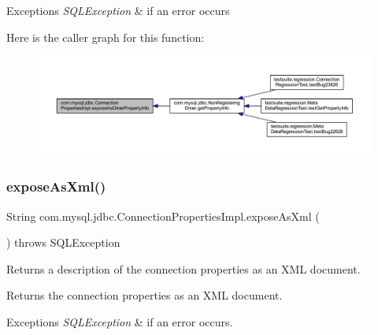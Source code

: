 \begin{DoxyExceptions}{Exceptions}
{\em S\+Q\+L\+Exception} & if an error occurs \\
\hline
\end{DoxyExceptions}
Here is the caller graph for this function\+:\nopagebreak
\begin{figure}[H]
\begin{center}
\leavevmode
\includegraphics[width=350pt]{classcom_1_1mysql_1_1jdbc_1_1_connection_properties_impl_a810088febe63fb8c4bf25651f6b92020_icgraph}
\end{center}
\end{figure}
\mbox{\label{classcom_1_1mysql_1_1jdbc_1_1_connection_properties_impl_a1f5d852e50bec0d2947c724c9a33f8ee}} 
\subsubsection{\texorpdfstring{expose\+As\+Xml()}{exposeAsXml()}}
{\footnotesize\ttfamily String com.\+mysql.\+jdbc.\+Connection\+Properties\+Impl.\+expose\+As\+Xml (\begin{DoxyParamCaption}{ }\end{DoxyParamCaption}) throws S\+Q\+L\+Exception}

Returns a description of the connection properties as an X\+ML document.

\begin{DoxyReturn}{Returns}
the connection properties as an X\+ML document. 
\end{DoxyReturn}

\begin{DoxyExceptions}{Exceptions}
{\em S\+Q\+L\+Exception} & if an error occurs. \\
\hline
\end{DoxyExceptions}


